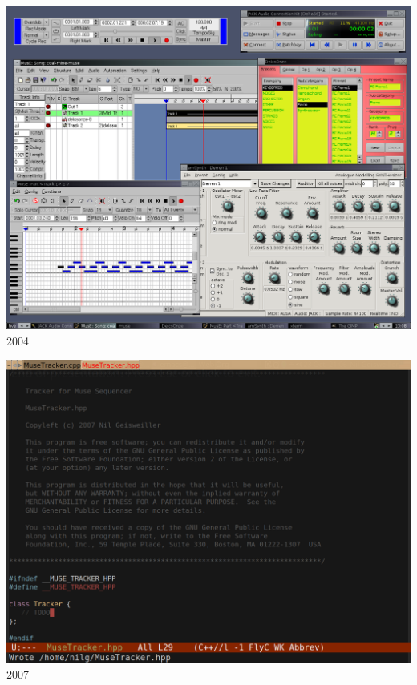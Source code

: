 \documentclass{beamer}
\begin{document}
\begin{frame}
  \begin{center}
    \includegraphics[scale=0.2605]{images/1-jack-qjackctl-muse-sync.png}\\
    2004
  \end{center}
\end{frame}

\begin{frame}
  \begin{center}
    \includegraphics[scale=0.2085]{images/muse-tracker.png}\\
    2007
  \end{center}
\end{frame}
\end{document}
